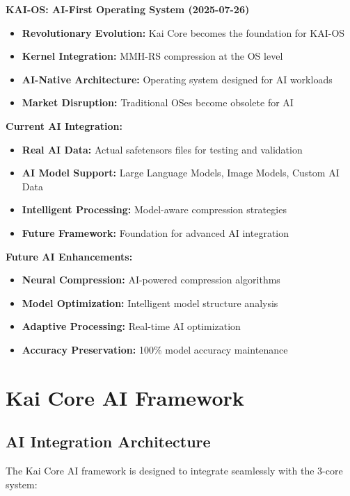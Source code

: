 \documentclass[12pt,a4paper]{article}
\begin{document}
\textbf{KAI-OS: AI-First Operating System (2025-07-26)}
\begin{itemize}
    \item \textbf{Revolutionary Evolution:} Kai Core becomes the foundation for KAI-OS
    \item \textbf{Kernel Integration:} MMH-RS compression at the OS level
    \item \textbf{AI-Native Architecture:} Operating system designed for AI workloads
    \item \textbf{Market Disruption:} Traditional OSes become obsolete for AI
\end{itemize}

\textbf{Current AI Integration:}
\begin{itemize}
    \item \textbf{Real AI Data:} Actual safetensors files for testing and validation
    \item \textbf{AI Model Support:} Large Language Models, Image Models, Custom AI Data
    \item \textbf{Intelligent Processing:} Model-aware compression strategies
    \item \textbf{Future Framework:} Foundation for advanced AI integration
\end{itemize}

\textbf{Future AI Enhancements:}
\begin{itemize}
    \item \textbf{Neural Compression:} AI-powered compression algorithms
    \item \textbf{Model Optimization:} Intelligent model structure analysis
    \item \textbf{Adaptive Processing:} Real-time AI optimization
    \item \textbf{Accuracy Preservation:} 100\% model accuracy maintenance
\end{itemize}

\section{Kai Core AI Framework}

\subsection{AI Integration Architecture}

The Kai Core AI framework is designed to integrate seamlessly with the 3-core system:
\end{document}
